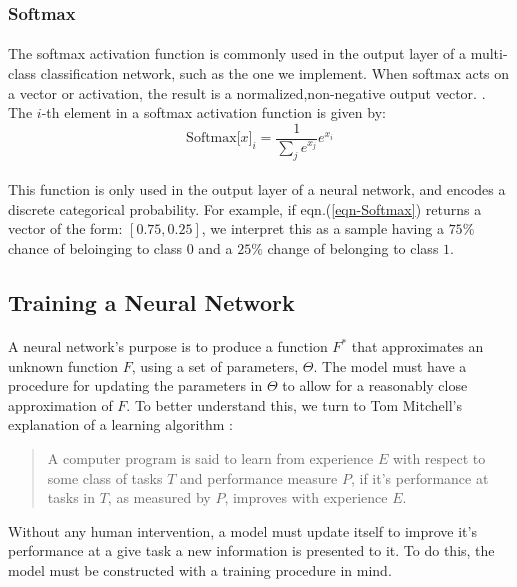\documentclass[12pt,letterpaper]{article}
\begin{document}

\subsubsection{Softmax}

\paragraph*{}The softmax activation function is commonly used in the output layer of a multi-class classification network, such as the one we implement. When softmax acts on a vector or activation, the result is a normalized,non-negative output vector. \cite{Geron,Goodfellow,Virtanen}. The $i$-th element in a softmax activation function is given by:
\begin{equation}
\label{eqn-Softmax}
\text{Softmax}\big[ x \big]_{i} = \frac{1}{\sum_{j}e^{x_j}}e^{x_i}
\end{equation}

\paragraph*{}This function is only used in the output layer of a neural network, and encodes a discrete categorical probability. For example, if eqn.(\ref{eqn-Softmax}) returns a vector of the form: $[ 0.75 , 0.25]$, we interpret this as a sample having a $75\%$ chance of beloinging to class $0$ and a $25\%$ change of belonging to class $1$.



\subsection{Training a Neural Network}
\label{subsec-Training}

\paragraph*{}A neural network's purpose is to produce a function $F^*$ that approximates an unknown function $F$, using a set of parameters, $\Theta$. The model must have a procedure for updating the parameters in $\Theta$ to allow for a reasonably close approximation of $F$. To better understand this, we turn to Tom Mitchell's explanation of a learning algorithm \cite{Goodfellow,Mitchell}:
\begin{quote}
A computer program is said to learn from experience $E$ with respect to some class of tasks $T$ and performance measure $P$, if it's performance at tasks in $T$, as measured by $P$, improves with experience $E$.
\end{quote}
Without any human intervention, a model must update itself to improve it's performance at a give task a new information is presented to it. To do this, the model must be constructed with a training procedure in mind. 
\end{document}
